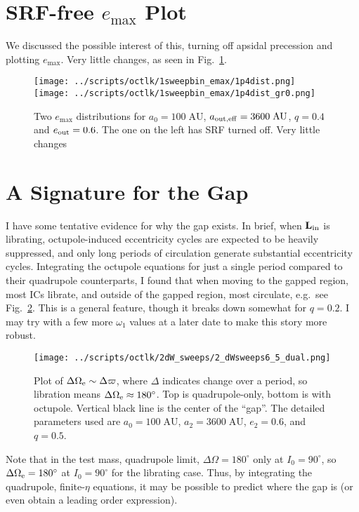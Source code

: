 \documentclass[11pt,
        usenames, %
        dvipsnames %
    ]{article}
\newcommand*{\bm}[1]{\boldsymbol{\mathbf{#1}}}
\begin{document}
\section{SRF-free $e_{\max}$ Plot}

We discussed the possible interest of this, turning off apsidal precession and
plotting $e_{\max}$. Very little changes, as seen in Fig.~\ref{fig:srf}.
\begin{figure}[h]
    \centering
    \texttt{[image: ../scripts/octlk/1sweepbin\_emax/1p4dist.png]}
    \texttt{[image: ../scripts/octlk/1sweepbin\_emax/1p4dist\_gr0.png]}
    \caption{Two $e_{\max}$ distributions for $a_0 = 100\;\mathrm{AU}$, $a_{\rm
    out, eff} = 3600\;\mathrm{AU}$, $q = 0.4$ and $e_{\rm out} = 0.6$. The one
    on the left has SRF turned off. Very little changes}\label{fig:srf}
\end{figure}

\section{A Signature for the Gap}

I have some tentative evidence for why the gap exists. In brief, when
$\bm{L}_{\rm in}$ is librating, octupole-induced eccentricity cycles are
expected to be heavily suppressed, and only long periods of circulation generate
substantial eccentricity cycles. Integrating the octupole equations for just a
single period compared to their quadrupole counterparts, I found that when
moving to the gapped region, most ICs librate, and outside of the gapped region,
most circulate, e.g.\ see Fig.~\ref{fig:gap_maybe}. This is a general feature,
though it breaks down somewhat for $q = 0.2$. I may try with a few more
$\omega_1$ values at a later date to make this story more robust.
\begin{figure}
    \centering
    \texttt{[image: ../scripts/octlk/2dW\_sweeps/2\_dWsweeps6\_5\_dual.png]}
    \caption{Plot of $\Delta \Omega_{\rm e} \sim \Delta \varpi$, where $\Delta$
    indicates change over a period, so libration means $\Delta \Omega_{\rm e}
    \approx 180^\circ$. Top is quadrupole-only, bottom is with octupole.
    Vertical black line is the center of the ``gap''. The detailed parameters
    used are $a_0 = 100\;\mathrm{AU}$, $a_2 = 3600\;\mathrm{AU}$, $e_2 = 0.6$,
    and $q = 0.5$.}\label{fig:gap_maybe}
\end{figure}

Note that in the test mass, quadrupole limit, $\Delta \Omega = 180^\circ$ only
at $I_0 = 90^\circ$, so $\Delta \Omega_{\rm e} = 180^\circ$ at $I_0 = 90^\circ$
for the librating case. Thus, by integrating the quadrupole, finite-$\eta$
equations, it may be possible to predict where the gap is (or even obtain a
leading order expression).
\end{document}
